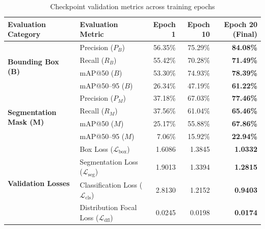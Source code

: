 \documentclass[12pt,a4paper,oneside]{report}
\begin{document}
\begin{table}[htbp]
\caption{Checkpoint validation metrics across training epochs}
\label{tab:checkpoint_metrics}
\centering
\begin{tabular}{llrrr}
\toprule
\textbf{Evaluation Category} & \textbf{Evaluation Metric} & \textbf{Epoch 1} & \textbf{Epoch 10} & \textbf{Epoch 20 (Final)}\\
\midrule
\multirow{4}{*}{\textbf{Bounding Box (B)}} 
  & Precision ($P_B$) & 56.35\% & 75.29\% & \textbf{84.08\%}\\
  & Recall ($R_B$) & 55.42\% & 70.28\% & \textbf{71.49\%}\\
  & mAP@50 ($B$) & 53.30\% & 74.93\% & \textbf{78.39\%}\\
  & mAP@50--95 ($B$) & 26.34\% & 47.19\% & \textbf{61.22\%}\\
\midrule
\multirow{4}{*}{\textbf{Segmentation Mask (M)}} 
  & Precision ($P_M$) & 37.18\% & 67.03\% & \textbf{77.46\%}\\
  & Recall ($R_M$) & 37.56\% & 61.04\% & \textbf{65.46\%}\\
  & mAP@50 ($M$) & 25.17\% & 55.88\% & \textbf{67.86\%}\\
  & mAP@50--95 ($M$) & 7.06\% & 15.92\% & \textbf{22.94\%}\\
\midrule
\multirow{4}{*}{\textbf{Validation Losses}} 
  & Box Loss ($\mathcal{L}_{\text{box}}$) & 1.6086 & 1.3845 & \textbf{1.0332}\\
  & Segmentation Loss ($\mathcal{L}_{\text{seg}}$) & 1.9013 & 1.3394 & \textbf{1.2815}\\
  & Classification Loss ($\mathcal{L}_{\text{cls}}$) & 2.8130 & 1.2152 & \textbf{0.9403}\\
  & Distribution Focal Loss ($\mathcal{L}_{\text{dfl}}$) & 0.0245 & 0.0198 & \textbf{0.0174}\\
\bottomrule
\end{tabular}
\end{table}
\end{document}
